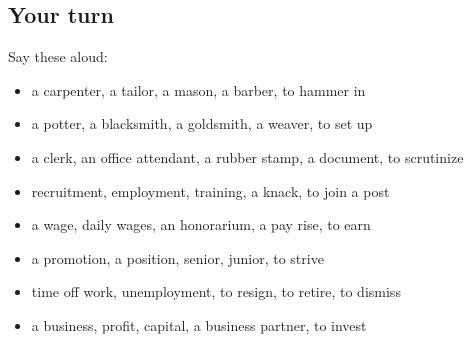 \subsection*{Your turn}
Say these aloud:

\begin{itemize}
\raggedright
  \item a carpenter, a tailor, a mason, a barber, to hammer in
  \item a potter, a blacksmith, a goldsmith, a weaver, to set up
  \item a clerk, an office attendant, a rubber stamp, a document, to scrutinize
  \item recruitment, employment, training, a knack, to join a post
  \item a wage, daily wages, an honorarium, a pay rise, to earn
  \item a promotion, a position, senior, junior, to strive
  \item time off work, unemployment, to resign, to retire, to dismiss
  \item a business, profit, capital, a business partner, to invest
\end{itemize}

